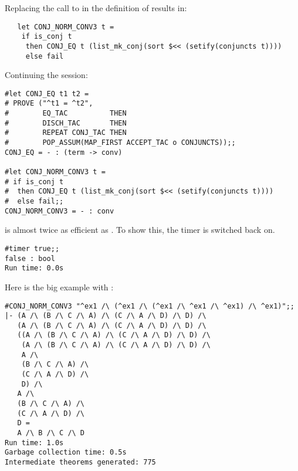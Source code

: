 \noindent Replacing the call to  in the definition
of  results in:

\begin{hol}\begin{verbatim}
   let CONJ_NORM_CONV3 t =
    if is_conj t
     then CONJ_EQ t (list_mk_conj(sort $<< (setify(conjuncts t))))
     else fail
\end{verbatim}\end{hol}

\noindent Continuing the session:

\begin{session}\begin{verbatim}
#let CONJ_EQ t1 t2 = 
# PROVE ("^t1 = ^t2", 
#        EQ_TAC          THEN 
#        DISCH_TAC       THEN
#        REPEAT CONJ_TAC THEN 
#        POP_ASSUM(MAP_FIRST ACCEPT_TAC o CONJUNCTS));;
CONJ_EQ = - : (term -> conv)

#let CONJ_NORM_CONV3 t =
# if is_conj t
#  then CONJ_EQ t (list_mk_conj(sort $<< (setify(conjuncts t))))
#  else fail;;
CONJ_NORM_CONV3 = - : conv
\end{verbatim}\end{session}

\noindent {} is almost twice
as efficient as . To show this, the timer is switched 
back on.

\begin{session}\begin{verbatim}
#timer true;;
false : bool
Run time: 0.0s
\end{verbatim}\end{session}

\noindent Here is the big example with :

\begin{session}\begin{verbatim}
#CONJ_NORM_CONV3 "^ex1 /\ (^ex1 /\ (^ex1 /\ ^ex1 /\ ^ex1) /\ ^ex1)";;
|- (A /\ (B /\ C /\ A) /\ (C /\ A /\ D) /\ D) /\
   (A /\ (B /\ C /\ A) /\ (C /\ A /\ D) /\ D) /\
   ((A /\ (B /\ C /\ A) /\ (C /\ A /\ D) /\ D) /\
    (A /\ (B /\ C /\ A) /\ (C /\ A /\ D) /\ D) /\
    A /\
    (B /\ C /\ A) /\
    (C /\ A /\ D) /\
    D) /\
   A /\
   (B /\ C /\ A) /\
   (C /\ A /\ D) /\
   D =
   A /\ B /\ C /\ D
Run time: 1.0s
Garbage collection time: 0.5s
Intermediate theorems generated: 775
\end{verbatim}\end{session}

